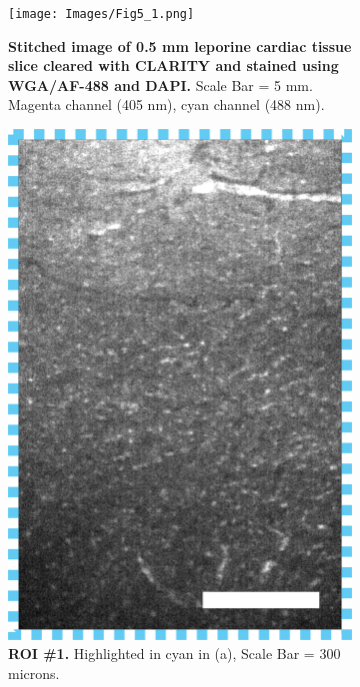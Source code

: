 \begin{figure}[H]
\centering
\begin{subfigure}[t]{0.9\textwidth}
\texttt{[image: Images/Fig5\_1.png]}
\caption{\textbf{Stitched image of 0.5 mm leporine cardiac tissue slice cleared with CLARITY and stained using WGA/AF-488 and DAPI.} Scale Bar = 5 mm. Magenta channel (405 nm), cyan channel (488 nm).}
\end{subfigure}
\medskip

\begin{subfigure}[t]{0.475\textwidth}
\centering
\includegraphics[width=0.75\linewidth]{Images/ROI1.png}
\caption{\textbf{ROI \#1.} Highlighted in cyan in (a), Scale Bar = 300 microns.}
\end{subfigure}
\medskip
~
\begin{subfigure}[t]{0.475\textwidth}
\centering

\end{subfigure}
\end{figure}
